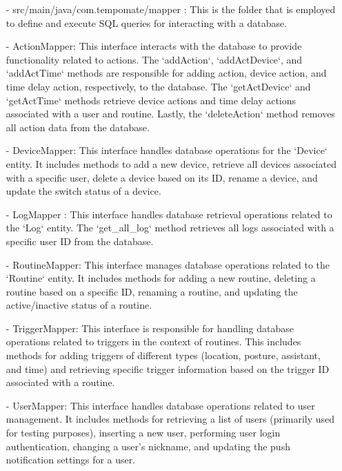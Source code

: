 \begin{enumerate}
    \item[-] src/main/java/com.tempomate/mapper : This is the folder that is employed to define and execute SQL queries for interacting with a database. \\
    \item[-] ActionMapper: This interface interacts with the database to provide functionality related to actions. The `addAction`, `addActDevice`, and `addActTime` methods are responsible for adding action, device action, and time delay action, respectively, to the database. The `getActDevice` and `getActTime` methods retrieve device actions and time delay actions associated with a user and routine. Lastly, the `deleteAction` method removes all action data from the database. \\
    \item[-] DeviceMapper: This interface handles database operations for the `Device` entity. It includes methods to add a new device, retrieve all devices associated with a specific user, delete a device based on its ID, rename a device, and update the switch status of a device. \\
    \item[-] LogMapper : This interface handles database retrieval operations related to the `Log` entity. The `get\_all\_log` method retrieves all logs associated with a specific user ID from the database.\\
    \item[-] RoutineMapper: This interface manages database operations related to the `Routine` entity. It includes methods for adding a new routine, deleting a routine based on a specific ID, renaming a routine, and updating the active/inactive status of a routine. \\
    \item[-] TriggerMapper: This interface is responsible for handling database operations related to triggers in the context of routines. This includes methods for adding triggers of different types (location, posture, assistant, and time) and retrieving specific trigger information based on the trigger ID associated with a routine. \\
    \item[-] UserMapper: This interface handles database operations related to user management. It includes methods for retrieving a list of users (primarily used for testing purposes), inserting a new user, performing user login authentication, changing a user's nickname, and updating the push notification settings for a user. \\

\end{enumerate}
